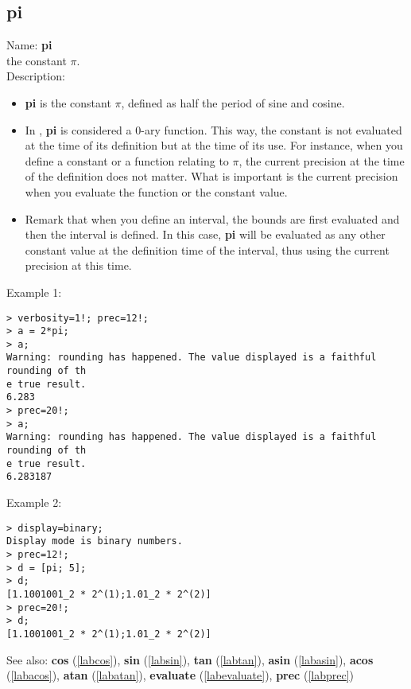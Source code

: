 \subsection{pi}
\label{labpi}
\noindent Name: \textbf{pi}\\
the constant $\pi$.\\
\noindent Description: \begin{itemize}

\item \textbf{pi} is the constant $\pi$, defined as half the period of sine and cosine.

\item In \sollya, \textbf{pi} is considered a 0-ary function. This way, the constant 
   is not evaluated at the time of its definition but at the time of its use. For 
   instance, when you define a constant or a function relating to $\pi$, the current
   precision at the time of the definition does not matter. What is important is 
   the current precision when you evaluate the function or the constant value.

\item Remark that when you define an interval, the bounds are first evaluated and 
   then the interval is defined. In this case, \textbf{pi} will be evaluated as any 
   other constant value at the definition time of the interval, thus using the 
   current precision at this time.
\end{itemize}
\noindent Example 1: 
\begin{center}\begin{minipage}{15cm}\begin{Verbatim}[frame=single]
> verbosity=1!; prec=12!;
> a = 2*pi;
> a;
Warning: rounding has happened. The value displayed is a faithful rounding of th
e true result.
6.283
> prec=20!;
> a;
Warning: rounding has happened. The value displayed is a faithful rounding of th
e true result.
6.283187
\end{Verbatim}
\end{minipage}\end{center}
\noindent Example 2: 
\begin{center}\begin{minipage}{15cm}\begin{Verbatim}[frame=single]
> display=binary;
Display mode is binary numbers.
> prec=12!;
> d = [pi; 5];
> d;
[1.1001001_2 * 2^(1);1.01_2 * 2^(2)]
> prec=20!;
> d;
[1.1001001_2 * 2^(1);1.01_2 * 2^(2)]
\end{Verbatim}
\end{minipage}\end{center}
See also: \textbf{cos} (\ref{labcos}), \textbf{sin} (\ref{labsin}), \textbf{tan} (\ref{labtan}), \textbf{asin} (\ref{labasin}), \textbf{acos} (\ref{labacos}), \textbf{atan} (\ref{labatan}), \textbf{evaluate} (\ref{labevaluate}), \textbf{prec} (\ref{labprec})
